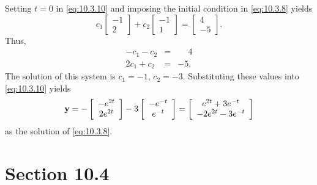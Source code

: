 \begin{examplesolution}
 Setting $t=0$ in \eqref{eq:10.3.10} and imposing the initial condition in
\eqref{eq:10.3.8} yields
\[
  c_{1}\left[
  \begin{array}{r}
    -1 \\
    2
  \end{array}\right]+c_{2}\left[
  \begin{array}{r}
    -1 \\
    1
  \end{array}\right]= \left[
  \begin{array}{r}
    4  \\
    -5
  \end{array}\right].
\]
Thus,
\begin{eqnarray*}
  -c_{1}-c_{2} & = & \phantom{-}4 \\
  2c_{1}+c_{2} & = & -5.
\end{eqnarray*}
The solution of this system is $c_{1}=-1$, $c_{2}=-3$. Substituting these values into
\eqref{eq:10.3.10} yields
\[
  {\bf y}=-\left[
  \begin{array}{c}
    -e^{2t} \\
    2e^{2t}
  \end{array}
  \right]-3 \left[
  \begin{array}{c}
    -e^{-t} \\
    e^{-t}
  \end{array}\right]= \left[
  \begin{array}{c}
    e^{2t}+3e^{-t}   \\
    -2e^{2t}-3e^{-t}
  \end{array}\right]
\]
as the solution of \eqref{eq:10.3.8}.
\end{examplesolution}

\section*{Section 10.4}
\setcounter{chapter}{10}
\setcounter{section}{4}

